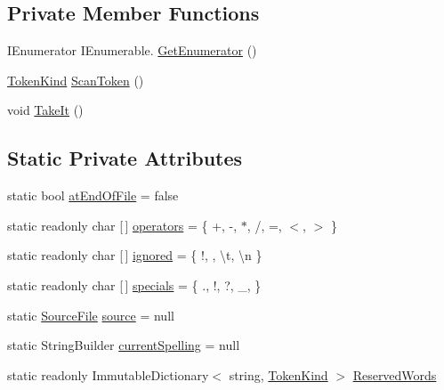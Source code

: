 \subsection*{Private Member Functions}
\begin{DoxyCompactItemize}
\item 
I\+Enumerator I\+Enumerable. \mbox{\hyperlink{class_compiler_1_1_scanner_a9a5c3cbfcd7608679a85403d93e0faef}{Get\+Enumerator}} ()
\item 
\mbox{\hyperlink{namespace_compiler_a57929962f25004759596fc3f13cf563c}{Token\+Kind}} \mbox{\hyperlink{class_compiler_1_1_scanner_a373e66b40365f842b514f388c0becb61}{Scan\+Token}} ()
\item 
void \mbox{\hyperlink{class_compiler_1_1_scanner_af112ca8e7a48e769ab142b1fbb4d8802}{Take\+It}} ()
\end{DoxyCompactItemize}
\subsection*{Static Private Attributes}
\begin{DoxyCompactItemize}
\item 
static bool \mbox{\hyperlink{class_compiler_1_1_scanner_aa96dbbef2d22ecf0a62c0a8c26d960a8}{at\+End\+Of\+File}} = false
\item 
static readonly char \mbox{[}$\,$\mbox{]} \mbox{\hyperlink{class_compiler_1_1_scanner_a06b412dc474f3c625169dea913ee95da}{operators}} = \{ \textquotesingle{}+\textquotesingle{}, \textquotesingle{}-\/\textquotesingle{}, \textquotesingle{}$\ast$\textquotesingle{}, \textquotesingle{}/\textquotesingle{}, \textquotesingle{}=\textquotesingle{}, \textquotesingle{}$<$\textquotesingle{}, \textquotesingle{}$>$\textquotesingle{} \}
\item 
static readonly char \mbox{[}$\,$\mbox{]} \mbox{\hyperlink{class_compiler_1_1_scanner_afe7355d6751272f7fd901cdd885a1bd1}{ignored}} = \{ \textquotesingle{}!\textquotesingle{}, \textquotesingle{} \textquotesingle{}, \textquotesingle{}\textbackslash{}t\textquotesingle{}, \textquotesingle{}\textbackslash{}n\textquotesingle{} \}
\item 
static readonly char \mbox{[}$\,$\mbox{]} \mbox{\hyperlink{class_compiler_1_1_scanner_ab3e4b27f11afa6d99ec2f09e8ab0b8bd}{specials}} = \{ \textquotesingle{}.\textquotesingle{}, \textquotesingle{}!\textquotesingle{}, \textquotesingle{}?\textquotesingle{}, \textquotesingle{}\+\_\+\textquotesingle{}, \textquotesingle{} \textquotesingle{} \}
\item 
static \mbox{\hyperlink{class_compiler_1_1_source_file}{Source\+File}} \mbox{\hyperlink{class_compiler_1_1_scanner_a6fa17eef62c3cf43853464ccfbd61966}{source}} = null
\item 
static String\+Builder \mbox{\hyperlink{class_compiler_1_1_scanner_a3bea5b7c795b6ecfff02cf15f197e277}{current\+Spelling}} = null
\item 
static readonly Immutable\+Dictionary$<$ string, \mbox{\hyperlink{namespace_compiler_a57929962f25004759596fc3f13cf563c}{Token\+Kind}} $>$ \mbox{\hyperlink{class_compiler_1_1_scanner_af08999456293c083a301561a5f96ca8b}{Reserved\+Words}}
\end{DoxyCompactItemize}



